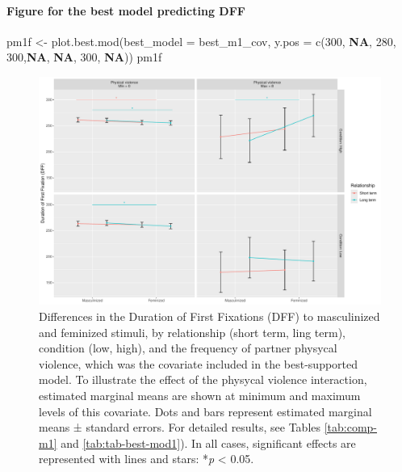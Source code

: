 \documentclass[
  bookmarksnumbered]{article}
\newenvironment{Shaded}{\begin{snugshade}}{\end{snugshade}}
\newcommand{\AttributeTok}[1]{\textcolor[rgb]{0.80,0.80,0.80}{#1}}
\newcommand{\ConstantTok}[1]{\textcolor[rgb]{0.86,0.64,0.64}{\textbf{#1}}}
\newcommand{\DecValTok}[1]{\textcolor[rgb]{0.86,0.86,0.80}{#1}}
\newcommand{\FunctionTok}[1]{\textcolor[rgb]{0.94,0.94,0.56}{#1}}
\newcommand{\NormalTok}[1]{\textcolor[rgb]{0.80,0.80,0.80}{#1}}
\newcommand{\OtherTok}[1]{\textcolor[rgb]{0.94,0.94,0.56}{#1}}
\begin{document}
\paragraph{Figure for the best model predicting DFF}\label{figure-for-the-best-model-predicting-dff}

\begin{Shaded}
\begin{Highlighting}[]
\NormalTok{pm1f }\OtherTok{\textless{}{-}} \FunctionTok{plot.best.mod}\NormalTok{(}\AttributeTok{best\_model =}\NormalTok{ best\_m1\_cov, }\AttributeTok{y.pos =} \FunctionTok{c}\NormalTok{(}\DecValTok{300}\NormalTok{, }\ConstantTok{NA}\NormalTok{, }\DecValTok{280}\NormalTok{, }\DecValTok{300}\NormalTok{,}\ConstantTok{NA}\NormalTok{, }\ConstantTok{NA}\NormalTok{, }\DecValTok{300}\NormalTok{, }\ConstantTok{NA}\NormalTok{))}
\NormalTok{pm1f}
\end{Highlighting}
\end{Shaded}

\begin{figure}
\centering
\includegraphics{Supplementary_material_files/figure-latex/fig-mod1-cov-1.pdf}
\caption{\label{fig:fig-mod1-cov}Differences in the Duration of First Fixations (DFF) to masculinized and feminized stimuli, by relationship (short term, ling term), condition (low, high), and the frequency of partner physycal violence, which was the covariate included in the best-supported model. To illustrate the effect of the physycal violence interaction, estimated marginal means are shown at minimum and maximum levels of this covariate. Dots and bars represent estimated marginal means ± standard errors. For detailed results, see Tables \ref{tab:comp-m1} and \ref{tab:tab-best-mod1}). In all cases, significant effects are represented with lines and stars: *\emph{p} \textless{} 0.05.}
\end{figure}
\end{document}
